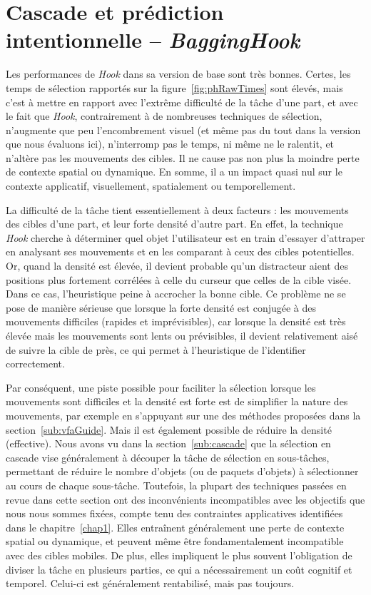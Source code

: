	\section{Cascade et prédiction intentionnelle -- \emph{BaggingHook}}
	Les performances de \emph{Hook} dans sa version de base sont très bonnes. Certes, les temps de sélection rapportés sur la figure~\ref{fig:phRawTimes} sont élevés, mais c'est à mettre en rapport avec l'extrême difficulté de la tâche d'une part, et avec le fait que \emph{Hook}, contrairement à de nombreuses techniques de sélection, n'augmente que peu l'encombrement visuel (et même pas du tout dans la version que nous évaluons ici), n'interromp pas le temps, ni même ne le ralentit, et n'altère pas les mouvements des cibles. Il ne cause pas non plus la moindre perte de contexte spatial ou dynamique. En somme, il a un impact quasi nul sur le contexte applicatif, visuellement, spatialement ou temporellement.
	
	La difficulté de la tâche tient essentiellement à deux facteurs : les mouvements des cibles d'une part, et leur forte densité d'autre part. En effet, la technique \emph{Hook} cherche à déterminer quel objet l'utilisateur est en train d'essayer d'attraper en analysant ses mouvements et en les comparant à ceux des cibles potentielles. Or, quand la densité est élevée, il devient probable qu'un distracteur aient des positions plus fortement corrélées à celle du curseur que celles de la cible visée. Dans ce cas, l'heuristique peine à \og accrocher \fg{} la bonne cible. Ce problème ne se pose de manière sérieuse que lorsque la forte densité est conjugée à des mouvements difficiles (rapides et imprévisibles), car lorsque la densité est très élevée mais les mouvements sont lents ou prévisibles, il devient relativement aisé de suivre la cible de près, ce qui permet à l'heuristique de l'identifier correctement.
	
	Par conséquent, une piste possible pour faciliter la sélection lorsque les mouvements sont difficiles et la densité est forte est de simplifier la nature des mouvements, par exemple en s'appuyant sur une des méthodes proposées dans la section~\ref{sub:vfaGuide}. Mais il est également possible de réduire la densité (effective). Nous avons vu dans la section~\ref{sub:cascade} que la sélection en cascade vise généralement à découper la tâche de sélection en sous-tâches, permettant de réduire le nombre d'objets (ou de paquets d'objets) à sélectionner au cours de chaque sous-tâche. Toutefois, la plupart des techniques passées en revue dans cette section ont des inconvénients incompatibles avec les objectifs que nous nous sommes fixées, compte tenu des contraintes applicatives identifiées dans le chapitre~\ref{chap1}. Elles entraînent généralement une perte de contexte spatial ou dynamique, et peuvent même être fondamentalement incompatible avec des cibles mobiles. De plus, elles impliquent le plus souvent l'obligation de diviser la tâche en plusieurs parties, ce qui a nécessairement un coût cognitif et temporel. Celui-ci est généralement rentabilisé, mais pas toujours.
	

